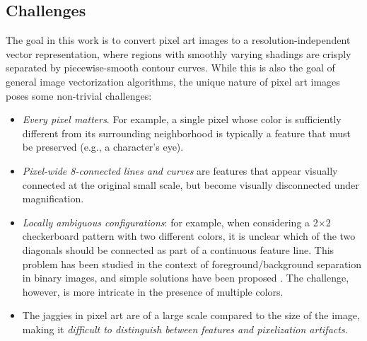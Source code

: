 \documentclass[]{usiinfbachelorproject}
\begin{document}
\subsection{Challenges}
The goal in this work is to convert pixel art images to a resolution-independent vector representation, where regions with smoothly varying shadings are crisply separated by piecewise-smooth contour curves. While this is also the goal of general image vectorization algorithms, the unique nature of pixel art images poses some non-trivial challenges:
\begin{itemize}
	\item \emph{Every pixel matters}. For example, a single pixel whose color is sufficiently different from its surrounding neighborhood is typically a feature that must be preserved (e.g., a character's eye).
	\item \emph{Pixel-wide 8-connected lines and curves} are features that appear visually connected at the original small scale, but become visually disconnected under magnification.
	\item \emph{Locally ambiguous configurations}: for example, when considering a 2$\times$2 checkerboard pattern with two different colors, it is unclear which of the two diagonals should be connected as part of a continuous feature line. This problem has been studied in the context of foreground/background separation in binary images, and simple solutions have been proposed \cite{Kong1996}. The challenge, however, is more intricate in the presence of multiple colors.
	\item The jaggies in pixel art are of a large scale compared to the size of the image, making it \emph{difficult to distinguish between features and pixelization artifacts}.
\end{itemize}

\end{document}
